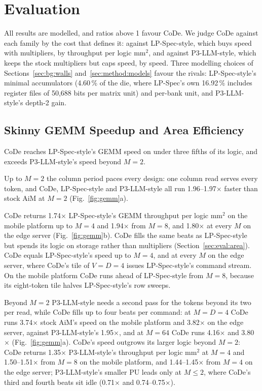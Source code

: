 \section{Evaluation}
\label{sec:eval}

All results are modelled, and ratios above 1 favour CoDe. We judge CoDe against each family by the cost that defines
it: against LP-Spec-style, which buys speed with multipliers, by throughput per logic mm$^2$, and against P3-LLM-style,
which keeps the stock multipliers but caps speed, by speed. Three modelling choices of
Sections~\ref{sec:bg:walls} and~\ref{sec:method:models} favour the rivals: LP-Spec-style's minimal accumulators (4.60\,\% of the die, where LP-Spec's own 16.92\,\% includes
register files of 50,688 bits per matrix unit) and per-bank unit, and P3-LLM-style's depth-2 gain.

\subsection{Skinny GEMM Speedup and Area Efficiency}
\label{sec:eval:gemm}

CoDe reaches LP-Spec-style's GEMM speed on under three fifths of its logic, and exceeds P3-LLM-style's speed beyond
$M = 2$.

Up to $M = 2$ the column period paces every design: one column read serves every token, and CoDe,
LP-Spec-style and P3-LLM-style all run 1.96--1.97$\times$ faster than stock AiM at $M = 2$ (Fig.~\ref{fig:gemm}a).

CoDe returns 1.74$\times$ LP-Spec-style's GEMM throughput per logic mm$^2$ on the mobile platform up to $M = 4$ and
1.94$\times$ from $M = 8$, and 1.80$\times$ at every $M$ on the edge server (Fig.~\ref{fig:gemm}b). CoDe fills the same
beats as LP-Spec-style but spends its logic on storage rather than multipliers (Section~\ref{sec:eval:area}). CoDe equals LP-Spec-style's speed up to $M = 4$, and at every
$M$ on the edge server, where CoDe's tile of $V = D = 4$ issues LP-Spec-style's command stream. On the mobile platform
CoDe runs ahead of LP-Spec-style from $M = 8$, because its eight-token tile halves LP-Spec-style's row sweeps.

Beyond $M = 2$ P3-LLM-style needs a second pass for the tokens beyond its two per read, while CoDe fills up to four
beats per command: at $M = D = 4$ CoDe runs 3.74$\times$ stock AiM's speed on the mobile platform and 3.82$\times$ on
the edge server, against P3-LLM-style's 1.95$\times$, and at $M = 64$ CoDe runs 4.16$\times$ and 3.80$\times$
(Fig.~\ref{fig:gemm}a). CoDe's speed outgrows its larger logic beyond $M = 2$: CoDe returns 1.35$\times$
P3-LLM-style's throughput per logic mm$^2$ at $M = 4$ and 1.50--1.51$\times$ from $M = 8$ on the mobile platform, and
1.44--1.45$\times$ from $M = 4$ on the edge server; P3-LLM-style's smaller PU leads only at $M \le 2$, where CoDe's
third and fourth beats sit idle (0.71$\times$ and 0.74--0.75$\times$).

